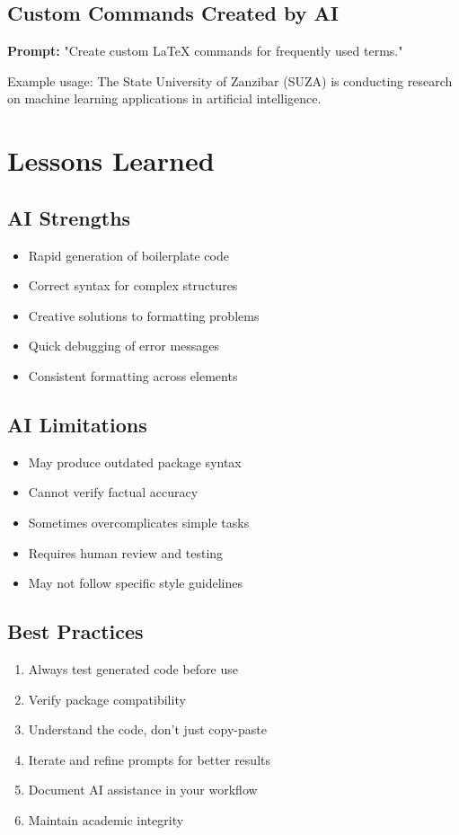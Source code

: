 \documentclass[12pt, a4paper]{article}
\begin{document}
\subsection{Custom Commands Created by AI}

\textbf{Prompt:} "Create custom LaTeX commands for frequently used terms."

\newcommand{\suza}{State University of Zanzibar (SUZA)}
\newcommand{\ml}{machine learning}
\newcommand{\ai}{artificial intelligence}

Example usage:
The \suza{} is conducting research on \ml{} applications in \ai{}.

\section{Lessons Learned}

\subsection{AI Strengths}
\begin{itemize}
    \item Rapid generation of boilerplate code
    \item Correct syntax for complex structures
    \item Creative solutions to formatting problems
    \item Quick debugging of error messages
    \item Consistent formatting across elements
\end{itemize}

\subsection{AI Limitations}
\begin{itemize}
    \item May produce outdated package syntax
    \item Cannot verify factual accuracy
    \item Sometimes overcomplicates simple tasks
    \item Requires human review and testing
    \item May not follow specific style guidelines
\end{itemize}

\subsection{Best Practices}
\begin{enumerate}
    \item Always test generated code before use
    \item Verify package compatibility
    \item Understand the code, don't just copy-paste
    \item Iterate and refine prompts for better results
    \item Document AI assistance in your workflow
    \item Maintain academic integrity
\end{enumerate}
\end{document}
